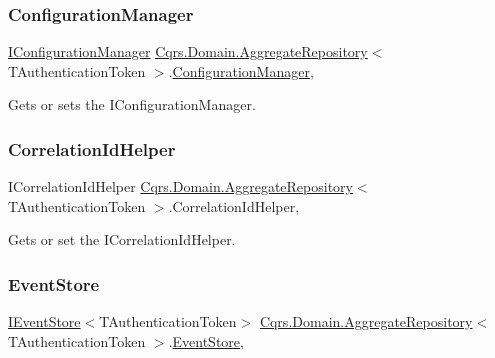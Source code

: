 \subsubsection{\texorpdfstring{Configuration\+Manager}{ConfigurationManager}}
{\footnotesize\ttfamily \hyperlink{interfaceCqrs_1_1Configuration_1_1IConfigurationManager}{I\+Configuration\+Manager} \hyperlink{classCqrs_1_1Domain_1_1AggregateRepository}{Cqrs.\+Domain.\+Aggregate\+Repository}$<$ T\+Authentication\+Token $>$.\hyperlink{classCqrs_1_1Configuration_1_1ConfigurationManager}{Configuration\+Manager}\hspace{0.3cm}{\ttfamily [get]}, {\ttfamily [protected]}}



Gets or sets the I\+Configuration\+Manager. 

\mbox{\label{classCqrs_1_1Domain_1_1AggregateRepository_a758d2fd5c0cf30bc038a996800421fd0_a758d2fd5c0cf30bc038a996800421fd0}} 
\subsubsection{\texorpdfstring{Correlation\+Id\+Helper}{CorrelationIdHelper}}
{\footnotesize\ttfamily I\+Correlation\+Id\+Helper \hyperlink{classCqrs_1_1Domain_1_1AggregateRepository}{Cqrs.\+Domain.\+Aggregate\+Repository}$<$ T\+Authentication\+Token $>$.Correlation\+Id\+Helper\hspace{0.3cm}{\ttfamily [get]}, {\ttfamily [protected]}}



Gets or set the I\+Correlation\+Id\+Helper. 

\mbox{\label{classCqrs_1_1Domain_1_1AggregateRepository_a99c8546ada9058c0488727b01c626528_a99c8546ada9058c0488727b01c626528}} 
\subsubsection{\texorpdfstring{Event\+Store}{EventStore}}
{\footnotesize\ttfamily \hyperlink{interfaceCqrs_1_1Events_1_1IEventStore}{I\+Event\+Store}$<$T\+Authentication\+Token$>$ \hyperlink{classCqrs_1_1Domain_1_1AggregateRepository}{Cqrs.\+Domain.\+Aggregate\+Repository}$<$ T\+Authentication\+Token $>$.\hyperlink{classCqrs_1_1Events_1_1EventStore}{Event\+Store}\hspace{0.3cm}{\ttfamily [get]}, {\ttfamily [protected]}}



